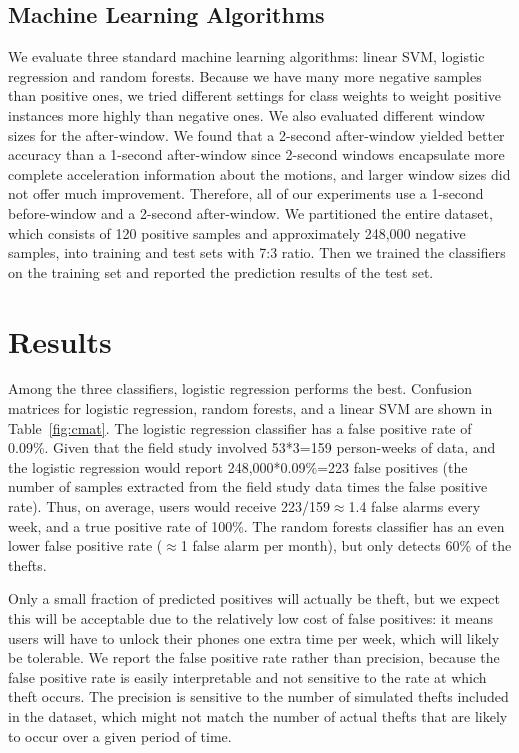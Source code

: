 \subsection{Machine Learning Algorithms}
We evaluate three standard machine learning algorithms: linear SVM, logistic regression and random forests.
Because we have many more negative samples than positive ones, we tried different settings for class weights to weight positive instances more highly than negative ones.
We also evaluated different window sizes for the after-window.
We found that a 2-second after-window yielded better accuracy than a 1-second after-window since 2-second windows encapsulate more complete acceleration information about the motions, and larger window sizes did not offer much improvement.
Therefore, all of our experiments use a 1-second before-window and a 2-second after-window.
We partitioned the entire dataset, which consists of 120 positive samples and approximately 248,000 negative samples, into training and test sets with 7:3 ratio.
Then we trained the classifiers on the training set and reported the prediction results of the test set.



\section{Results}
Among the three classifiers, logistic regression performs the best.
Confusion matrices for logistic regression, random forests, and a linear SVM
are shown in Table~\ref{fig:cmat}.
The logistic regression classifier has a false positive rate of 0.09\%. Given that the field study involved 53*3=159 person-weeks of data, and the logistic regression would report 248,000*0.09\%=223 false positives (the number of samples extracted from the field study data times the false positive rate). Thus, on average, users would receive 223/159$\approx$1.4 false alarms every week, and a true positive rate of 100\%.
The random forests classifier has an even lower false positive rate ($\approx$1 false alarm per month), but only detects 60\% of the thefts.

Only a small fraction of predicted positives will actually be theft, but we expect this will be acceptable due to the relatively low cost of false positives: it means users will have to unlock their phones one extra time per week, which will likely be tolerable. We report the false positive rate rather than precision, because the false positive rate is easily interpretable and not sensitive to the rate at which theft occurs. The precision is sensitive to the number of simulated thefts included in the dataset, which might not match the number of actual thefts that are likely to occur over a given period of time.

